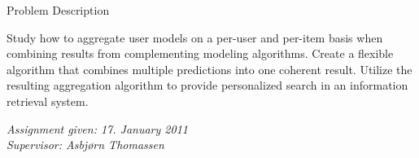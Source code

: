 \null\vspace{13em}
{
  \centering
  \normalfont
  \huge
  Problem Description\\
}
\vspace{2em}

\noindent
Study how to aggregate user models on a per-user and per-item
basis when combining results from complementing modeling algorithms.
Create a flexible algorithm that combines multiple predictions
into one coherent result.
Utilize the resulting aggregation algorithm
to provide personalized search in an information retrieval system.

\vspace{1em}
\begin{flushleft}
  \color{red}
  \itshape
  \hspace{2.5em}Assignment given: 17. January 2011\\
  \hspace{2.5em}Supervisor: Asbjørn Thomassen\\
\end{flushleft}

\cleardoublepage
